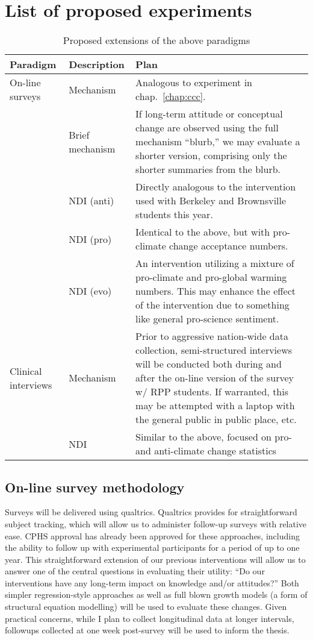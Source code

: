 \section{List of proposed experiments}

\begin{table}
\begin{tabular}{llp{}}
Paradigm & Description & Plan \\
\hline \hline
On-line surveys
    & Mechanism &  Analogous to experiment in chap.~\ref{chap:ccc}. \\
    & Brief mechanism & If long-term attitude or conceptual change are observed
        using the full mechanism ``blurb,'' we may evaluate a shorter version,
        comprising only the shorter summaries from the blurb. \\
    & NDI (anti) & Directly analogous to the intervention used with Berkeley and
        Brownsville students this year. \\
    & NDI (pro) & Identical to the above, but with pro-climate change acceptance
        numbers. \\
    & NDI (evo) & An intervention utilizing a mixture of pro-climate and
        pro-global warming numbers. This may enhance the effect of the
        intervention due to something like general pro-science sentiment. \\

Clinical interviews 
    & Mechanism & Prior to aggressive nation-wide data collection,
    semi-structured interviews will be conducted both during and after the
    on-line version of the survey w/ RPP students. If warranted, this may be
    attempted with a laptop with the general public in public place, etc. \\
    & NDI & Similar to the above, focused on pro- and anti-climate change
        statistics \\
\hline
\end{tabular}
\caption{Proposed extensions of the above paradigms}
\label{table:proposed}
\end{table}

\subsection{On-line survey methodology}

Surveys will be delivered using qualtrics. Qualtrics provides for
straightforward subject tracking, which will allow us to administer follow-up
surveys with relative ease. CPHS approval has already been approved for these
approaches, including the ability to follow up with experimental participants
for a period of up to one year. This straightforward extension of our previous
interventions will allow us to answer one of the central questions in evaluating
their utility: ``Do our interventions have any long-term impact on knowledge
and/or attitudes?'' Both simpler regression-style approaches as well as full
blown growth models (a form of structural equation modelling) will be used to
evaluate these changes. Given practical concerns, while I plan to collect
longitudinal data at longer intervals, followups collected at one week
post-survey will be used to inform the thesis.

